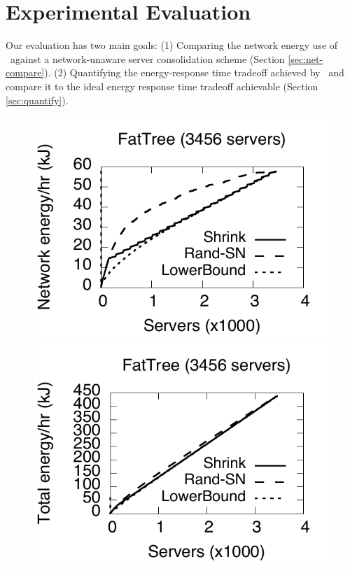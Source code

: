 \section{Experimental Evaluation}
\label{sec:shrink-eval}
\newcommand{\peakS}{Peak-S}
\newcommand{\peakSN}{Peak-SN}
\newcommand{\randSN}{Rand-SN}

Our evaluation has two main goals: (1) Comparing the network energy use of \shrink\ against a network-unaware server consolidation scheme (Section \ref{sec:net-compare}). (2) Quantifying the energy-response time tradeoff achieved by \shrink\ and compare it to the ideal energy response time tradeoff achievable (Section \ref{sec:quantify}).

\begin{figure}[t]
        \includegraphics[scale=0.4]{graphs/final/fattree-24.pdf}
                \includegraphics[scale=0.4]{graphs/final/fattree-24-total.pdf}

\end{figure}
